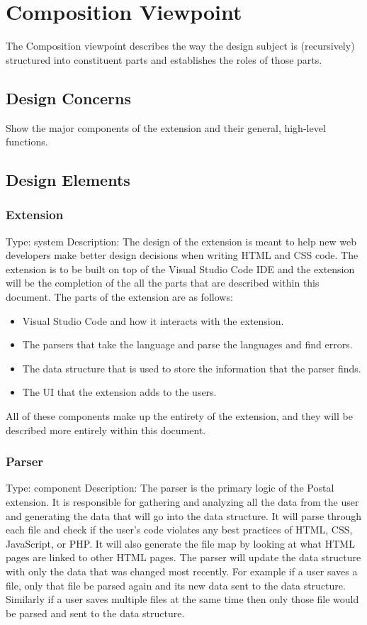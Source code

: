 \documentclass[letterpaper,10pt,titlepage,draftclsnofoot,onecolumn,onesided] {IEEEtran}
\begin{document}
\section{Composition Viewpoint}
The Composition viewpoint describes the way the design subject is (recursively) structured into constituent
parts and establishes the roles of those parts. 
\subsection{Design Concerns}
Show the major components of the extension and their general, high-level functions.
\subsection{Design Elements}

	\subsubsection{Extension}
	Type: system
	Description: The design of the extension is meant to help new web developers make better design decisions when writing HTML and CSS code.
	The extension is to be built on top of the Visual Studio Code IDE and the extension will be the completion of the all the parts that are described within this document. 
	The parts of the extension are as follows:
	\begin{itemize}
	\item Visual Studio Code and how it interacts with the extension.
	\item The parsers that take the language and parse the languages and find errors.
	\item The data structure that is used to store the information that the parser finds.
	\item The UI that the extension adds to the users. 
	\end{itemize}
	All of these components make up the entirety of the extension, and they will be described more entirely within this document. 
	
	\subsubsection{Parser}
	Type: component
	Description: 
	The parser is the primary logic of the Postal extension. 
	It is responsible for gathering and analyzing all the data from the user and generating the data that will go into the data structure.
	It will parse through each file and check if the user's code violates any best practices of HTML, CSS, JavaScript, or PHP. 
	It will also generate the file map by looking at what HTML pages are linked to other HTML pages.
	The parser will update the data structure with only the data that was changed most recently.
	For example if a user saves a file, only that file be parsed again and its new data sent to the data structure.
	Similarly if a user saves multiple files at the same time then only those file would be parsed and sent to the data structure.
	
\end{document}
